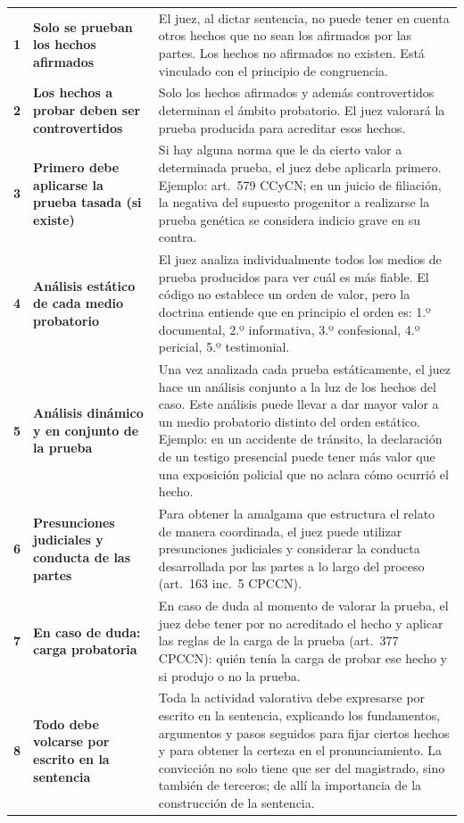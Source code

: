 \documentclass[12pt,oneside]{book}
\begin{document}
\begin{longtable}{>{\raggedright\arraybackslash}p{1.6cm} >{\raggedright\arraybackslash}p{3.8cm} >{\raggedright\arraybackslash}p{7.6cm}}
\textbf{1} & \textbf{Solo se prueban los hechos afirmados} & El juez, al dictar sentencia, no puede tener en cuenta otros hechos que no sean los afirmados por las partes. Los hechos no afirmados no existen. Está vinculado con el principio de congruencia. \\
\addlinespace
\textbf{2} & \textbf{Los hechos a probar deben ser controvertidos} & Solo los hechos afirmados y además controvertidos determinan el ámbito probatorio. El juez valorará la prueba producida para acreditar esos hechos. \\
\addlinespace
\textbf{3} & \textbf{Primero debe aplicarse la prueba tasada (si existe)} & Si hay alguna norma que le da cierto valor a determinada prueba, el juez debe aplicarla primero. Ejemplo: art.~579 CCyCN; en un juicio de filiación, la negativa del supuesto progenitor a realizarse la prueba genética se considera indicio grave en su contra. \\
\addlinespace
\textbf{4} & \textbf{Análisis estático de cada medio probatorio} & El juez analiza individualmente todos los medios de prueba producidos para ver cuál es más fiable. El código no establece un orden de valor, pero la doctrina entiende que en principio el orden es: 1.º documental, 2.º informativa, 3.º confesional, 4.º pericial, 5.º testimonial. \\
\addlinespace
\textbf{5} & \textbf{Análisis dinámico y en conjunto de la prueba} & Una vez analizada cada prueba estáticamente, el juez hace un análisis conjunto a la luz de los hechos del caso. Este análisis puede llevar a dar mayor valor a un medio probatorio distinto del orden estático. Ejemplo: en un accidente de tránsito, la declaración de un testigo presencial puede tener más valor que una exposición policial que no aclara cómo ocurrió el hecho. \\
\addlinespace
\textbf{6} & \textbf{Presunciones judiciales y conducta de las partes} & Para obtener la amalgama que estructura el relato de manera coordinada, el juez puede utilizar presunciones judiciales y considerar la conducta desarrollada por las partes a lo largo del proceso (art.~163 inc.~5 CPCCN). \\
\addlinespace
\textbf{7} & \textbf{En caso de duda: carga probatoria} & En caso de duda al momento de valorar la prueba, el juez debe tener por no acreditado el hecho y aplicar las reglas de la carga de la prueba (art.~377 CPCCN): quién tenía la carga de probar ese hecho y si produjo o no la prueba. \\
\addlinespace
\textbf{8} & \textbf{Todo debe volcarse por escrito en la sentencia} & Toda la actividad valorativa debe expresarse por escrito en la sentencia, explicando los fundamentos, argumentos y pasos seguidos para fijar ciertos hechos y para obtener la certeza en el pronunciamiento. La convicción no solo tiene que ser del magistrado, sino también de terceros; de allí la importancia de la construcción de la sentencia. \\
\bottomrule
\end{longtable}
\end{document}
